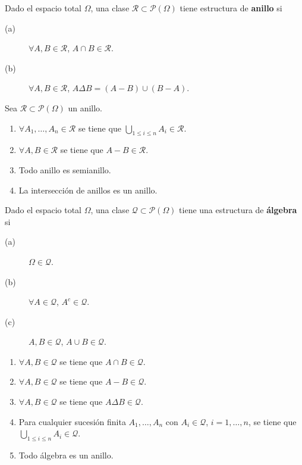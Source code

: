 \begin{definition}[Anillo]
Dado el espacio total $\displaystyle \Omega  $, una clase $\displaystyle \mathcal{R} \subset \mathcal{P}\left(\Omega \right) $ tiene estructura de \textbf{anillo} si 
\begin{description}
\item[(a)] $\displaystyle \forall A,B \in \mathcal{R} $, $\displaystyle A \cap B \in \mathcal{R} $.
\item[(b)] $\displaystyle \forall A, B \in \mathcal{R} $, $\displaystyle A \Delta B = \left(A - B\right) \cup \left(B - A\right)$.
\end{description}
\end{definition}
\begin{prop} Sea $\displaystyle \mathcal{R} \subset \mathcal{P} \left(\Omega \right) $ un anillo.
\begin{enumerate}
\item $\displaystyle \forall A_{1}, \ldots, A_{n} \in \mathcal{R} $ se tiene que $\displaystyle \bigcup_{1 \leq i \leq n}A_{i} \in \mathcal{R} $.
\item $\displaystyle \forall A,B \in \mathcal{R} $ se tiene que $\displaystyle A - B \in \mathcal{R} $.
\item Todo anillo es semianillo. 
\item La intersección de anillos es un anillo.
\end{enumerate}
\end{prop}
\begin{definition}[Álgebra]
Dado el espacio total $\displaystyle \Omega  $, una clase $\displaystyle \mathcal{Q}\subset \mathcal{P}\left(\Omega \right) $ tiene una estructura de \textbf{álgebra} si
\begin{description}
\item[(a)] $\displaystyle \Omega \in \mathcal{Q} $.
\item[(b)] $\displaystyle \forall A \in \mathcal{Q} $, $\displaystyle A^{c} \in \mathcal{Q} $.
\item[(c)] $\displaystyle A,B \in \mathcal{Q} $, $\displaystyle A \cup B \in \mathcal{Q} $.
\end{description}
\end{definition}
\begin{prop}
\begin{enumerate}
\item $\displaystyle \forall A,B \in \mathcal{Q} $ se tiene que $\displaystyle A \cap B \in \mathcal{Q} $.
\item $\displaystyle \forall A, B \in \mathcal{Q} $ se tiene que $\displaystyle A - B \in \mathcal{Q} $.
\item $\displaystyle \forall A, B \in \mathcal{Q} $ se tiene que $\displaystyle A \Delta B \in \mathcal{Q} $.
\item Para cualquier sucesión finita $\displaystyle A_{1}, \ldots, A_{n} $ con $\displaystyle A_{i} \in \mathcal{Q} $, $\displaystyle i = 1, \ldots, n $, se tiene que $\displaystyle \bigcup_{1 \leq i\leq n}A_{i} \in \mathcal{Q} $.
\item Todo álgebra es un anillo.
\end{enumerate}
\end{prop}

